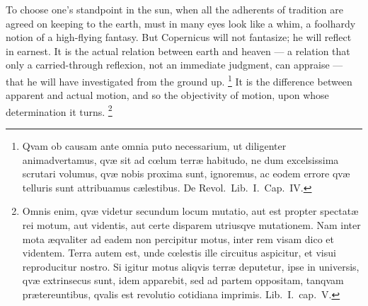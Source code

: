 \documentclass[12pt,a4paper]{book}
\renewcommand{\thefootnote}{*)}
\begin{document}
To choose one's standpoint in the sun, when all the adherents of tradition are agreed on keeping to the
earth, must in many eyes look like a whim, a foolhardy notion of a high-flying fantasy. But Copernicus will
not fantasize; he will reflect in earnest. It is the actual relation between earth and heaven --- a
relation that only a carried-through reflexion, not an immediate judgment, can appraise --- that he will
have investigated from the ground up.%
\renewcommand{\thefootnote}{**)}%
\footnote{%
Qvam ob causam ante omnia puto necessarium, ut diligenter animadvertamus, qvæ sit ad cœlum terræ habitudo,
ne dum excelsissima scrutari volumus, qvæ nobis proxima sunt, ignoremus, ac eodem errore qvæ telluris sunt
attribuamus cælestibus. De Revol.\ Lib.\ I.\ Cap.\ IV.}%
\renewcommand{\thefootnote}{*)}
It is the difference between apparent and actual motion, and so the objectivity of motion, upon whose
determination it turns.%
\renewcommand{\thefootnote}{***)}%
\footnote{%
Omnis enim, qvæ videtur secundum locum mutatio, aut est propter spectatæ rei motum, aut videntis, aut certe
disparem utriusqve mutationem. Nam inter mota æqvaliter ad eadem non percipitur motus, inter rem visam dico
et videntem. Terra autem est, unde cœlestis ille circuitus aspicitur, et visui reproducitur nostro. Si
igitur motus aliqvis terræ deputetur, ipse in universis, qvæ extrinsecus sunt, idem apparebit, sed ad partem
oppositam, tanqvam prætereuntibus, qvalis est revolutio cotidiana imprimis. Lib.\ I.\ cap.\ V.}%
\renewcommand{\thefootnote}{*)}
\end{document}
